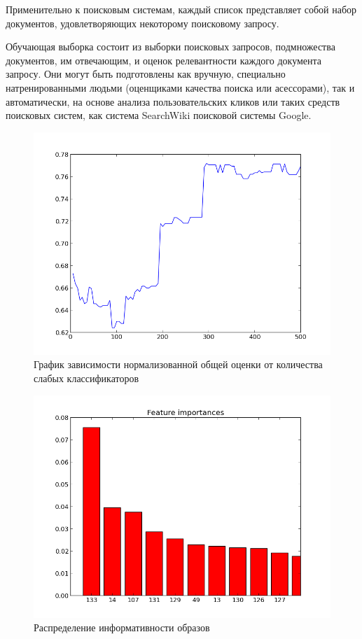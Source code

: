 Применительно к поисковым системам, каждый список представляет собой набор документов, удовлетворяющих некоторому поисковому запросу.

Обучающая выборка состоит из выборки поисковых запросов, подмножества документов, им отвечающим, и оценок релевантности каждого документа запросу. Они могут быть подготовлены как вручную, специально натренированными людьми (оценщиками качества поиска или асессорами), так и автоматически, на основе анализа пользовательских кликов или таких средств поисковых систем, как система SearchWiki поисковой системы Google.

\begin{figure}[h]
  \centering
  \includegraphics[width=1.0\textwidth]{images/ndcg_result1.png}
  \caption{График зависимости нормализованной общей оценки от количества слабых классификаторов\label{ndcg-picture}}
\end{figure}

\begin{figure}[h]
  \centering
  \includegraphics[width=1.0\textwidth]{images/feature_importance.png}
  \caption{Распределение  информативности образов\label{feature-importance-picture}}
\end{figure}


